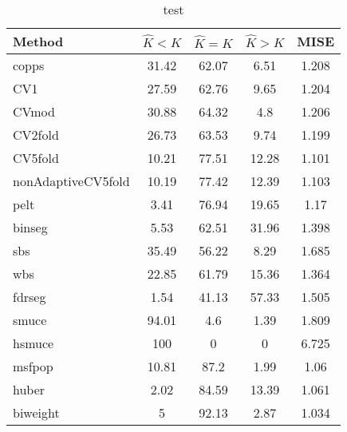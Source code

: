 \begin{table}[ht]
\centering
\begin{tabular}{l|cccc}
  \hline
Method & $\hat{K} < K$ & $\hat{K} = K$ & $\hat{K} > K$ & MISE \\ 
  \hline
copps & 31.42 & 62.07 &  6.51 & 1.208 \\ 
  CV1 & 27.59 & 62.76 &  9.65 & 1.204 \\ 
  CVmod & 30.88 & 64.32 &   4.8 & 1.206 \\ 
  CV2fold & 26.73 & 63.53 &  9.74 & 1.199 \\ 
  CV5fold & 10.21 & 77.51 & 12.28 & 1.101 \\ 
  nonAdaptiveCV5fold & 10.19 & 77.42 & 12.39 & 1.103 \\ 
  pelt &  3.41 & 76.94 & 19.65 &  1.17 \\ 
  binseg &  5.53 & 62.51 & 31.96 & 1.398 \\ 
  sbs & 35.49 & 56.22 &  8.29 & 1.685 \\ 
  wbs & 22.85 & 61.79 & 15.36 & 1.364 \\ 
  fdrseg &  1.54 & 41.13 & 57.33 & 1.505 \\ 
  smuce & 94.01 &   4.6 &  1.39 & 1.809 \\ 
  hsmuce &   100 &     0 &     0 & 6.725 \\ 
  msfpop & 10.81 &  87.2 &  1.99 &  1.06 \\ 
  huber &  2.02 & 84.59 & 13.39 & 1.061 \\ 
  biweight &     5 & 92.13 &  2.87 & 1.034 \\ 
   \hline
\end{tabular}
\caption{test} 
\end{table}
